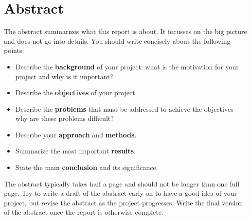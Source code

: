 \chapter*{Abstract}

The abstract summarizes what this report is about.
It focusses on the big picture and does not go into details.
You should write concisely about the following points:

\begin{itemize}
  \item Describe the \textbf{background} of your project: what is the motivation for your project and why is it important?
  \item Describe the \textbf{objectives} of your project.
  \item Describe the \textbf{problems} that must be addressed to achieve the objectives---why are these problems difficult?
  \item Describe your \textbf{approach} and \textbf{methods}.
  \item Summarize the most important \textbf{results}.
  \item State the main \textbf{conclusion} and its significance.
\end{itemize}

The abstract typically takes half a page and should not be longer than one full page.
Try to write a draft of the abstract early on to have a good idea of your project, but revise the abstract as the project progresses.
Write the final version of the abstract once the report is otherwise complete.


